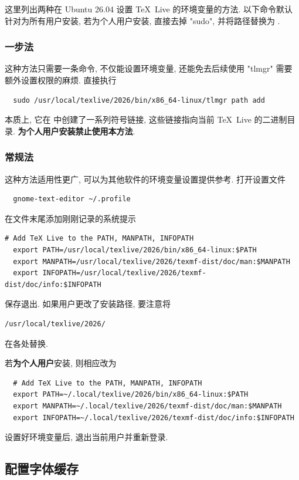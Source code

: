 这里列出两种在 Ubuntu 26.04 设置 \TeX~Live 的环境变量的方法.
以下命令默认针对为所有用户安装,
若为个人用户安装,
直接去掉 "sudo",
并将路径替换为 .

\subsubsection{一步法}

这种方法只需要一条命令,
不仅能设置环境变量,
还能免去后续使用 "tlmgr" 需要额外设置权限的麻烦.
直接执行
\begin{lstlisting}
  sudo /usr/local/texlive/2026/bin/x86_64-linux/tlmgr path add
\end{lstlisting}
本质上,
它在  中创建了一系列符号链接,
这些链接指向当前 \TeX~Live 的二进制目录.
\textbf{为个人用户安装禁止使用本方法}.

\subsubsection{常规法}

这种方法适用性更广,
可以为其他软件的环境变量设置提供参考.
打开设置文件
\begin{lstlisting}
  gnome-text-editor ~/.profile
\end{lstlisting}
在文件末尾添加刚刚记录的系统提示
\begin{lstlisting}[deletekeywords = local]
  # Add TeX Live to the PATH, MANPATH, INFOPATH
  export PATH=/usr/local/texlive/2026/bin/x86_64-linux:$PATH
  export MANPATH=/usr/local/texlive/2026/texmf-dist/doc/man:$MANPATH
  export INFOPATH=/usr/local/texlive/2026/texmf-dist/doc/info:$INFOPATH
\end{lstlisting}
保存退出.
如果用户更改了安装路径,
要注意将
\begin{lstlisting}[language = {}]
  /usr/local/texlive/2026/
\end{lstlisting}
在各处替换.

若\textbf{为个人用户}安装,
则相应改为
\begin{lstlisting}
  # Add TeX Live to the PATH, MANPATH, INFOPATH
  export PATH=~/.local/texlive/2026/bin/x86_64-linux:$PATH
  export MANPATH=~/.local/texlive/2026/texmf-dist/doc/man:$MANPATH
  export INFOPATH=~/.local/texlive/2026/texmf-dist/doc/info:$INFOPATH
\end{lstlisting}

设置好环境变量后,
退出当前用户并重新登录.

\subsection{配置字体缓存}\label{sec:ubuntu:font}

